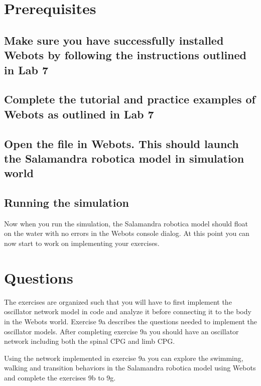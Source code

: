 \documentclass{cmc}
\begin{document}

\section*{Prerequisites}

\subsection*{Make sure you have successfully installed Webots by
  following the instructions outlined in Lab 7}

\subsection*{Complete the tutorial and practice examples of Webots as
  outlined in Lab 7}

\subsection*{Open the  file
  in Webots. This should launch the Salamandra robotica model in
  simulation world}

\subsection*{Running the simulation}
Now when you run the simulation, the Salamandra robotica model should
float on the water with no errors in the Webots console dialog. At
this point you can now start to work on implementing your exercises.

\newpage

\section*{Questions}

The exercises are organized such that you will have to first implement the
oscillator network model in  code and analyze it before
connecting it to the body in the Webots world.  Exercise 9a describes the
questions needed to implement the oscillator models. After completing exercise
9a you should have an oscillator network including both the spinal CPG and limb
CPG.

Using the network implemented in exercise 9a you can explore the swimming,
walking and transition behaviors in the Salamandra robotica model using Webots
and complete the exercises 9b to 9g.
\end{document}

